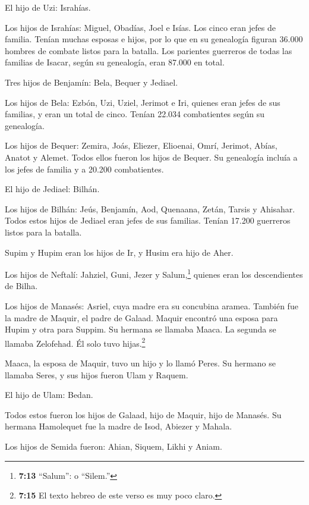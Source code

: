  El hijo de Uzi: Israhías.

Los hijos de Israhías: Miguel, Obadías, Joel e Isías. Los cinco eran
jefes de familia.  Tenían muchas esposas e hijos, por lo que
en su genealogía figuran 36.000 hombres de combate listos para la
batalla.  Los parientes guerreros de todas las familias de
Isacar, según su genealogía, eran 87.000 en total.

 Tres hijos de Benjamín: Bela, Bequer y Jediael.

 Los hijos de Bela: Ezbón, Uzi, Uziel, Jerimot e Iri,
quienes eran jefes de sus familias, y eran un total de cinco. Tenían
22.034 combatientes según su genealogía.

 Los hijos de Bequer: Zemira, Joás, Eliezer, Elioenai, Omrí,
Jerimot, Abías, Anatot y Alemet. Todos ellos fueron los hijos de Bequer.
 Su genealogía incluía a los jefes de familia y a 20.200
combatientes.

 El hijo de Jediael: Bilhán.

Los hijos de Bilhán: Jeús, Benjamín, Aod, Quenaana, Zetán, Tarsis y
Ahisahar.  Todos estos hijos de Jediael eran jefes de sus
familias. Tenían 17.200 guerreros listos para la batalla.

 Supim y Hupim eran los hijos de Ir, y Husim era hijo de
Aher.

 Los hijos de Neftalí: Jahziel, Guni, Jezer y
Salum,\footnote{\textbf{7:13} ``Salum'': o ``Silem.''} quienes eran los
descendientes de Bilha.

 Los hijos de Manasés: Asriel, cuya madre era su concubina
aramea. También fue la madre de Maquir, el padre de Galaad.
 Maquir encontró una esposa para Hupim y otra para Suppim.
Su hermana se llamaba Maaca. La segunda se llamaba Zelofehad. Él solo
tuvo hijas.\footnote{\textbf{7:15} El texto hebreo de este verso es muy
  poco claro.}

 Maaca, la esposa de Maquir, tuvo un hijo y lo llamó Peres.
Su hermano se llamaba Seres, y sus hijos fueron Ulam y Raquem.

 El hijo de Ulam: Bedan.

Todos estos fueron los hijos de Galaad, hijo de Maquir, hijo de Manasés.
 Su hermana Hamolequet fue la madre de Isod, Abiezer y
Mahala.

 Los hijos de Semida fueron: Ahian, Siquem, Likhi y Aniam.

